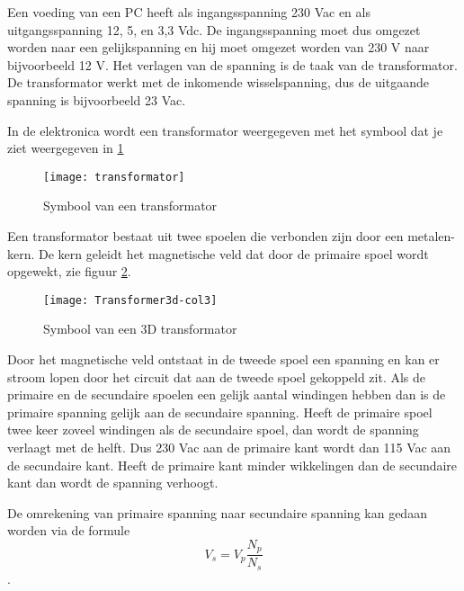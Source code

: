 Een voeding van een PC heeft als ingangsspanning 230 Vac en als uitgangsspanning 12, 5, en 3,3 Vdc. De ingangsspanning moet dus omgezet worden naar een gelijkspanning en hij moet omgezet worden van 230 V naar bijvoorbeeld 12 V. Het verlagen van de spanning is de taak van de transformator. De transformator werkt met de inkomende wisselspanning, dus de uitgaande spanning is bijvoorbeeld 23 Vac.

In de elektronica wordt een transformator weergegeven met het symbool dat je ziet weergegeven in \ref{symbool:transformator}

\begin{figure}[h]
\texttt{[image: transformator]}
\centering
\caption{Symbool van een transformator}
\label{symbool:transformator}
\end{figure}

Een transformator bestaat uit twee spoelen die verbonden zijn door een metalen-kern. De kern geleidt het magnetische veld dat door de primaire spoel wordt opgewekt, zie figuur \ref{fig:transformator3D}.

\begin{figure}[h]
\texttt{[image: Transformer3d-col3]}
\centering
\caption{Symbool van een 3D transformator}
\label{fig:transformator3D}
\end{figure}

Door het magnetische veld ontstaat in de tweede spoel een spanning en kan er stroom lopen door het circuit dat aan de tweede spoel gekoppeld zit. Als de primaire en de secundaire spoelen een gelijk aantal windingen hebben dan is de primaire spanning gelijk aan de secundaire spanning. Heeft de primaire spoel twee keer zoveel windingen als de secundaire spoel, dan wordt de spanning verlaagt met de helft. Dus 230 Vac aan de primaire kant wordt dan 115 Vac aan de secundaire kant. Heeft de primaire kant minder wikkelingen dan de secundaire kant dan wordt de spanning verhoogt.

De omrekening van primaire spanning naar secundaire spanning kan gedaan worden via de formule \[ V_s = V_p \frac{N_p}{N_s} \].
